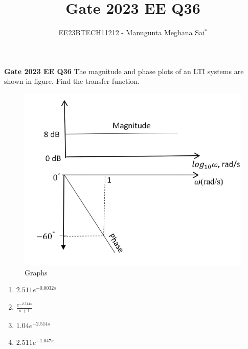 \documentclass[journal,12pt,twocolumn]{IEEEtran}
\theoremstyle{remark}
\begin{document}
    
    
    \vspace{3cm}
    
    \title{Gate 2023 EE Q36}
    \author{EE23BTECH11212 - Manugunta Meghana Sai$^{*}$%
    }
    \maketitle
    \newpage
    \bigskip
    
    \renewcommand{\thefigure}{\theenumi}
    \renewcommand{\thetable}{\theenumi}
    
    \vspace{3cm}
    \textbf{Gate 2023 EE Q36} 
    The magnitude and phase plots of an LTI systems are shown in figure. Find the transfer function.\\
    \begin{figure}[h!]
        \centering
        \includegraphics[width=\columnwidth]{figs/gate.jpeg}
        \caption{Graphs}
        \label{fig:1ee36}
    \end{figure}
    \begin{enumerate}
        \item $2.511 e^{-0.0032s}$\\
        \item $\frac{e^{-2.514s}}{s+1}$\\
        \item $1.04e^{-2.514s}$\\
        \item $2.511 e^{-1.047s}$\\
    \end{enumerate}
    
\end{document}

